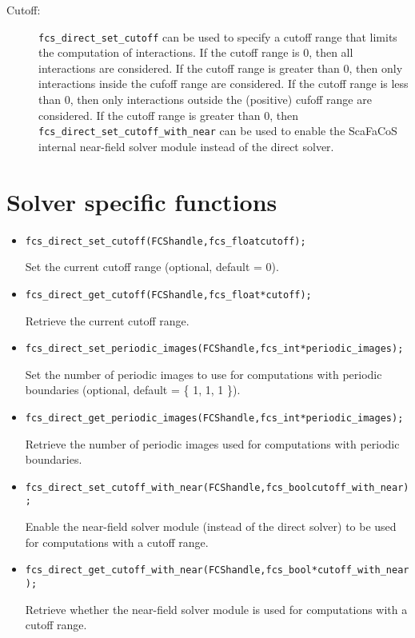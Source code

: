 \begin{description}

  \item[Cutoff:]
\texttt{fcs\_direct\_set\_cutoff} can be used to specify a cutoff range that limits the computation of interactions.
If the cutoff range is 0, then all interactions are considered.
If the cutoff range is greater than 0, then only interactions inside the cufoff range are considered.
If the cutoff range is less than 0, then only interactions outside the (positive) cufoff range are considered.
If the cutoff range is greater than 0, then \texttt{fcs\_direct\_set\_cutoff\_with\_near} can be used to enable the ScaFaCoS internal near-field solver module instead of the direct solver.

\end{description}

\section*{Solver specific functions}

\begin{itemize}

  \item
\begin{alltt}
fcs\_direct\_set\_cutoff(FCS handle, fcs_float cutoff);
\end{alltt}
Set the current cutoff range (optional, default = 0).

  \item
\begin{alltt}
fcs_direct_get_cutoff(FCS handle, fcs_float *cutoff);
\end{alltt}
Retrieve the current cutoff range.

  \item
\begin{alltt}
fcs_direct_set_periodic_images(FCS handle, fcs_int *periodic_images);
\end{alltt}
Set the number of periodic images to use for computations with periodic boundaries (optional, default = \{ 1, 1, 1 \}).

  \item
\begin{alltt}
fcs_direct_get_periodic_images(FCS handle, fcs_int *periodic_images);
\end{alltt}
Retrieve the number of periodic images used for computations with periodic boundaries.

  \item
\begin{alltt}
fcs_direct_set_cutoff_with_near(FCS handle, fcs_bool cutoff_with_near);
\end{alltt}
Enable the near-field solver module (instead of the direct solver) to be used for computations with a cutoff range.

  \item
\begin{alltt}
fcs_direct_get_cutoff_with_near(FCS handle, fcs_bool *cutoff_with_near);
\end{alltt}
Retrieve whether the near-field solver module is used for computations with a cutoff range.

\end{itemize}


